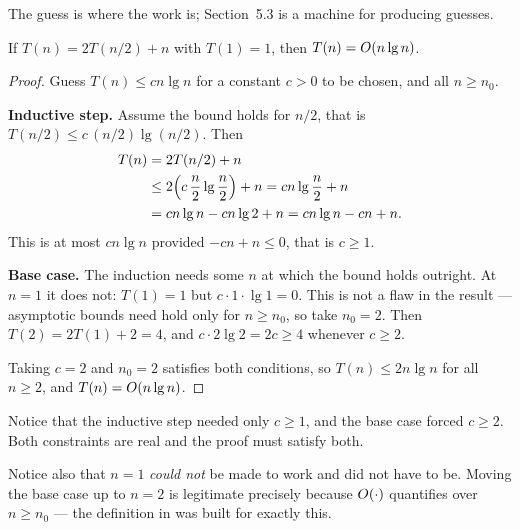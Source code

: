 The guess is where the work is; Section~5.3 is a machine for producing guesses.

\begin{theorem}\label{thm:mergerec}
If $T(n) = 2T(n/2) + n$ with $T(1) = 1$, then $T(n) = \bigO{n \lg n}$.
\end{theorem}

\begin{proof}
Guess $T(n) \le cn\lg n$ for a constant $c > 0$ to be chosen, and all
$n \ge n_{0}$.

\smallskip
\textbf{Inductive step.} Assume the bound holds for $n/2$, that is
$T(n/2) \le c\,(n/2)\lg(n/2)$. Then
\begin{align*}
T(n) &= 2T(n/2) + n \\
     &\le 2 \Bigl( c\,\frac{n}{2}\lg\frac{n}{2} \Bigr) + n
      = cn\lg\frac{n}{2} + n \\
     &= cn\lg n - cn\lg 2 + n
      = cn\lg n - cn + n.
\end{align*}
This is at most $cn \lg n$ provided $-cn + n \le 0$, that is $c \ge 1$.

\smallskip
\textbf{Base case.} The induction needs some $n$ at which the bound holds
outright. At $n = 1$ it does not: $T(1) = 1$ but $c \cdot 1 \cdot \lg 1 = 0$.
This is not a flaw in the result --- asymptotic bounds need hold only for
$n \ge n_{0}$, so take $n_{0} = 2$. Then $T(2) = 2T(1) + 2 = 4$, and
$c \cdot 2 \lg 2 = 2c \ge 4$ whenever $c \ge 2$.

\smallskip
Taking $c = 2$ and $n_{0} = 2$ satisfies both conditions, so
$T(n) \le 2n\lg n$ for all $n \ge 2$, and $T(n) = \bigO{n\lg n}$.
\end{proof}

\begin{alertbox}
Notice that the inductive step needed only $c \ge 1$, and the base case forced
$c \ge 2$. Both constraints are real and the proof must satisfy both.

\smallskip
Notice also that $n = 1$ \emph{could not} be made to work and did not have to
be. Moving the base case up to $n = 2$ is legitimate precisely because
$\bigO{\cdot}$ quantifies over $n \ge n_{0}$ --- the definition in
 was built for exactly this.
\end{alertbox}

